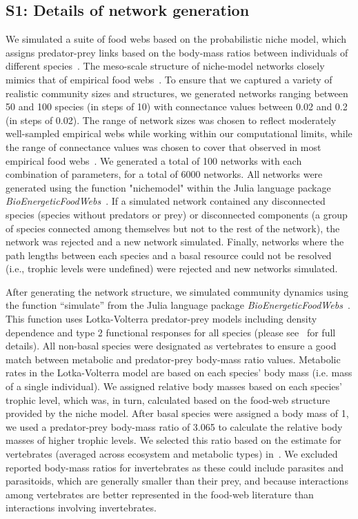 \documentclass[12pt]{article}
\begin{document}
\clearpage
\begin{spacing}{2.0}
\linenumbers
\section*{S1: Details of network generation}


	We simulated a suite of food webs based on the probabilistic niche model, which assigns predator-prey links based on the body-mass ratios between individuals of different species~\citep{Williams2000,Delmas2017}. The meso-scale structure of niche-model networks closely mimics that of empirical food webs~\citep{Stouffer2007}. To ensure that we captured a variety of realistic community sizes and structures, we generated networks ranging between 50 and 100 species (in steps of 10) with connectance values between 0.02 and 0.2 (in steps of 0.02). The range of network sizes was chosen to reflect moderately well-sampled empirical webs while working within our computational limits, while the range of connectance values was chosen to cover that observed in most empirical food webs~\citep{Dunne2002e}. We generated a total of 100 networks with each combination of parameters, for a total of 6000 networks. All networks were generated using the function "nichemodel" within the Julia language package \emph{BioEnergeticFoodWebs}~\citep{bioenergeticfw,Delmas2017}. If a simulated network contained any disconnected species (species without predators or prey) or disconnected components (a group of species connected among themselves but not to the rest of the network), the network was rejected and a new network simulated. Finally, networks where the path lengths between each species and a basal resource could not be resolved (i.e., trophic levels were undefined) were rejected and new networks simulated.


	After generating the network structure, we simulated community dynamics using the function ``simulate'' from the Julia language package \emph{BioEnergeticFoodWebs}~\citep{bioenergeticfw,Delmas2017}. This function uses Lotka-Volterra predator-prey models including density dependence and type 2 functional responses for all species (please see~\citet{Delmas2017} for full details).
	All non-basal species were designated as vertebrates to ensure a good match between metabolic and predator-prey body-mass ratio values. Metabolic rates in the Lotka-Volterra model are based on each species' body mass (i.e. mass of a single individual). We assigned relative body masses based on each species' trophic level, which was, in turn, calculated based on the food-web structure provided by the niche model. After basal species were assigned a body mass of 1, we used a predator-prey body-mass ratio of 3.065 to calculate the relative body masses of higher trophic levels. We selected this ratio based on the estimate for vertebrates (averaged across ecosystem and metabolic types) in~\citet{Brose2006}. We excluded reported body-mass ratios for invertebrates as these could include parasites and parasitoids, which are generally smaller than their prey, and because interactions among vertebrates are better represented in the food-web literature than interactions involving invertebrates.
	

\end{spacing}
\end{document}
